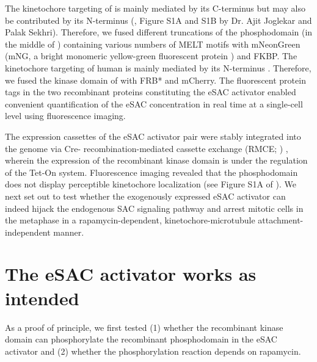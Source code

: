 The kinetochore targeting of  is mainly mediated by its C-terminus \cite{KNL1CTer_Kiyomitsu2007, Screpanti2011, Knl1CTer, MIS12CStructure_Petrovic2016, Spc105pCTer-MIND_Maskell2010} but may also be contributed by its N-terminus (\cite{eSAC}, Figure S1A and S1B by Dr. Ajit Joglekar and Palak Sekhri). Therefore, we fused different truncations of the  phosphodomain (in the middle of ) containing various numbers of MELT motifs with mNeonGreen (mNG, a bright monomeric yellow-green fluorescent protein \cite{mNG}) and FKBP. The kinetochore targeting of human  is mainly mediated by its N-terminus \cite{MPS1Localization_Ji, MPS1Localization_Hiruma, BuddingYeasteSAC}. Therefore, we fused the kinase domain of  with FRB* \cite{FRB_T2098L} and mCherry. The fluorescent protein tags in the two recombinant proteins constituting the eSAC activator enabled convenient quantification of the eSAC concentration in real time at a single-cell level using fluorescence imaging.

The expression cassettes of the eSAC activator pair were stably integrated into the genome via Cre- recombination-mediated cassette exchange (RMCE; ) \cite{HeLa-A12_Khandelia2011, HeLa-A12_Ballister2014}, wherein the expression of the recombinant  kinase domain is under the regulation of the Tet-On system. Fluorescence imaging revealed that the  phosphodomain does not display perceptible kinetochore localization (see Figure S1A of \cite{eSAC}). We next set out to test whether the exogenously expressed eSAC activator can indeed hijack the endogenous SAC signaling pathway and arrest mitotic cells in the metaphase in a rapamycin-dependent, kinetochore-microtubule attachment-independent manner.

\section{The eSAC activator works as intended}

As a proof of principle, we first tested (1) whether the recombinant  kinase domain can phosphorylate the recombinant  phosphodomain in the eSAC activator and (2) whether the phosphorylation reaction depends on rapamycin.

